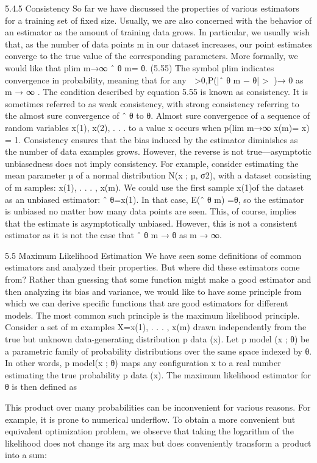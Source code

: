 \documentclass[11pt]{article}
\begin{document}
5.4.5 Consistency
So far we have discussed the properties of various estimators for a training set of ﬁxed size.
Usually, we are also concerned with the behavior of an estimator as the amount of training data grows.
In particular, we usually wish that, as the number of data points m in our dataset increases, our point estimates converge to the true value of the corresponding parameters.
More formally, we would like that plim m→∞ ˆ θ m= θ. (5.55)
The symbol plim indicates convergence in probability, meaning that for any  >0,P(|ˆ θ m − θ| > )→ 0 as m → ∞ .
The condition described by equation 5.55 is known as consistency.
It is sometimes referred to as weak consistency, with strong consistency referring to the almost sure convergence of ˆ θ to θ.
Almost sure convergence of a sequence of random variables x(1), x(2), . . . to a value x occurs when p(lim m→∞ x(m)= x) = 1.
Consistency ensures that the bias induced by the estimator diminishes as the number of data examples grows.
However, the reverse is not true—asymptotic unbiasedness does not imply consistency.
For example, consider estimating the mean parameter µ of a normal distribution N(x ; µ, σ2), with a dataset consisting of m samples: {x(1), . . . , x(m)}.
We could use the ﬁrst sample x(1)of the dataset as an unbiased estimator: ˆ θ=x(1).
In that case, E(ˆ θ m) =θ, so the estimator is unbiased no matter how many data points are seen.
This, of course, implies that the estimate is asymptotically unbiased.
However, this is not a consistent estimator as it is not the case that ˆ θ m → θ as m → ∞.

5.5 Maximum Likelihood Estimation
We have seen some deﬁnitions of common estimators and analyzed their properties.
But where did these estimators come from?
Rather than guessing that some function might make a good estimator and then analyzing its bias and variance, we would like to have some principle from which we can derive speciﬁc functions that are good estimators for diﬀerent models.
The most common such principle is the maximum likelihood principle.
Consider a set of m examples X={x(1), . . . , x(m)} drawn independently from the true but unknown data-generating distribution p data (x).
Let p model (x ; θ) be a parametric family of probability distributions over the same space indexed by θ.
In other words, p model(x ; θ) maps any conﬁguration x to a real number estimating the true probability p data (x).
The maximum likelihood estimator for θ is then deﬁned as

This product over many probabilities can be inconvenient for various reasons.
For example, it is prone to numerical underﬂow.
To obtain a more convenient but equivalent optimization problem, we observe that taking the logarithm of the likelihood does not change its arg max but does conveniently transform a product into a sum:
\end{document}
